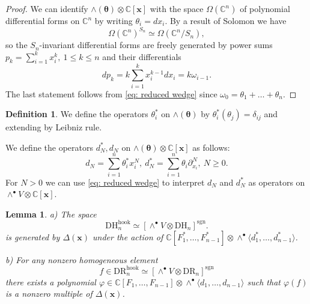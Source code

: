 \documentclass{amsart}
\newcommand{\C}{\mathbb{C}}
\newcommand{\xx}{\mathbf{x}}
\newcommand{\ttheta}{\boldsymbol{\theta}}
\newcommand{\DR}{\mathrm{DR}}
\renewcommand{\DH}{\mathrm{DH}}
\newcommand{\sgn}{\mathrm{sgn}}
\newcommand{\hook}{\mathrm{hook}}
\numberwithin{equation}{section}
\newtheorem{lemma}[theorem]{Lemma}
\theoremstyle{definition}
\newtheorem{definition}[theorem]{Definition}
\begin{document}
\begin{proof}
We can identify $\wedge(\ttheta)\otimes \C[\xx]$ with the space $\Omega(\C^n)$ of polynomial differential forms on $\C^n$ by writing $\theta_i=dx_i$. By a result of Solomon \cite{Solomon} we have
$$
\Omega(\C^n)^{S_n}\simeq \Omega(\C^n/S_n),
$$
so the $S_n$-invariant differential forms are freely generated by power sums $p_k=\sum_{i=1}^{k}x_i^k,\ 1\le k\le n$ and their differentials
$$
dp_k=k\sum_{i=1}^{k}x_i^{k-1}dx_i=k\omega_{i-1}.
$$
The last statement follows from \eqref{eq: reduced wedge} since $\omega_0=\theta_1+\ldots+\theta_n$.
\end{proof}

\begin{definition}
We define the operators $\theta_i^*$ on $\wedge(\ttheta)$ by $\theta_i^*(\theta_j)=\delta_{ij}$ and extending by Leibniz rule.

We define the operators $d^*_N,d_N$ on $\wedge(\ttheta)\otimes \C[\xx]$ as follows:
\begin{equation}
\label{eq: dN algebra}
d_N=\sum_{i=1}^{n}\theta_i^*x_i^{N},\ d_N^*=\sum_{i=1}^{n}\theta_i\partial_{x_i}^{N},\ N\ge 0.
\end{equation}
For $N>0$ we can use \eqref{eq: reduced wedge} to interpret $d_N$ and $d_N^*$ as operators on
$\wedge^{\bullet}V\otimes \C[\xx]$.
\end{definition}

\begin{lemma}
\label{lem: hooks generate}
a) The space 
$$
\DH_n^{\hook}\simeq \left[\wedge^{\bullet}V\otimes \DH_n\right]^{\sgn}.
$$
is generated by $\Delta(\xx)$ under the action of $\C[F_1^*,\ldots,F_{n-1}^*]\otimes \wedge^{\bullet}\langle d_{1}^*,\ldots,d_{n-1}^*\rangle$.

b) For any nonzero homogeneous element 
$$
f\in \DR_n^{\hook}\simeq \left[\wedge^{\bullet}V\otimes \DR_n\right]^{\sgn}
$$
there exists a polynomial $\varphi\in \C[F_1,\ldots,F_{n-1}]\otimes \wedge^{\bullet}\langle d_{1},\ldots,d_{n-1}\rangle$ such that $\varphi(f)$ is a nonzero multiple of $\Delta(\xx)$.
\end{lemma}
\end{document}
